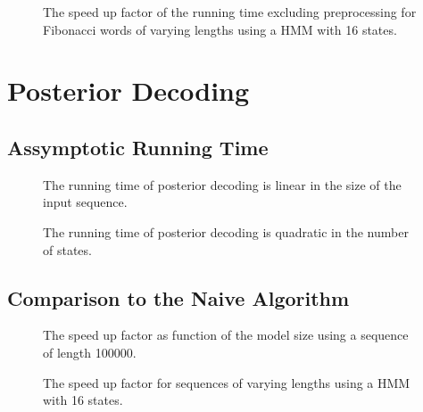 \begin{figure}[H]
  \centering
  
  \caption{The speed up factor of the running time excluding preprocessing for
    Fibonacci words of varying lengths using a HMM with 16 states.}
  \label{fig:fib_speedup_vs_sequence_length2}
\end{figure}

\section{Posterior Decoding}
\label{sec:posterior-decoding}

\subsection{Assymptotic Running Time}
\label{sec:assympt-runn-time}

\begin{figure}[H]
  \centering
  
  \caption{The running time of posterior decoding is linear in the size of the
    input sequence.}
  \label{fig:posterior_n}
\end{figure}

\begin{figure}[H]
  \centering
  
  \caption{The running time of posterior decoding is quadratic in the number of
    states.}
  \label{fig:posterior_k}
\end{figure}

\subsection{Comparison to the Naive Algorithm}
\label{sec:comp-naive-algor}

\begin{figure}[H]
  \centering
  
  \caption{The speed up factor as function of the model size using a sequence
    of length 100000.}
  \label{fig:posterior_speedup_vs_k}
\end{figure}

\begin{figure}[H]
  \centering
  
  \caption{The speed up factor for sequences of varying lengths using a HMM
    with 16 states.}
  \label{fig:posterior_speedup_vs_sequence_length}
\end{figure}

